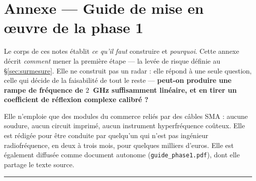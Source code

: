 \documentclass[11pt,a4paper]{article}
\begin{document}
\appendix

\section*{Annexe --- Guide de mise en \oe uvre de la phase 1}
\label{sec:annexephase1}

\noindent
Le corps de ces notes établit \emph{ce qu'il faut} construire et \emph{pourquoi}.
Cette annexe décrit \emph{comment} mener la première étape ---
la levée de risque définie au \S\ref{sec:surmesure}. Elle ne construit pas un
radar : elle répond à une seule question, celle qui décide de la faisabilité de
tout le reste --- \textbf{peut-on produire une rampe de fréquence de $2$~GHz
suffisamment linéaire, et en tirer un coefficient de réflexion complexe
calibré ?}

Elle n'emploie que des modules du commerce reliés par des câbles SMA : aucune
soudure, aucun circuit imprimé, aucun instrument hyperfréquence coûteux. Elle
est rédigée pour être conduite par quelqu'un qui n'est pas ingénieur
radiofréquence, en deux à trois mois, pour quelques milliers d'euros. Elle est
également diffusée comme document autonome (\texttt{guide\_phase1.pdf}), dont
elle partage le texte source.

\medskip\hrule\medskip


\end{document}
